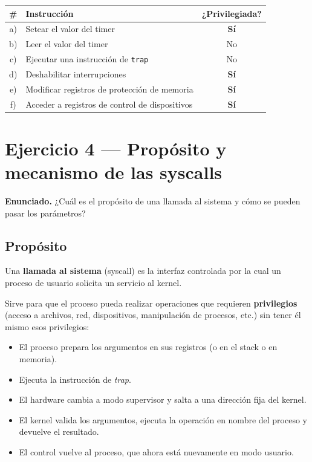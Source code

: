 \documentclass[11pt,a4paper]{article}
\begin{document}
\begin{center}
\small
\begin{tabular}{@{}clc@{}}
\toprule
\# & Instrucción                                    & ¿Privilegiada? \\
\midrule
a) & Setear el valor del timer                      & \textbf{Sí}    \\
b) & Leer el valor del timer                        & No             \\
c) & Ejecutar una instrucción de \texttt{trap}      & No             \\
d) & Deshabilitar interrupciones                    & \textbf{Sí}    \\
e) & Modificar registros de protección de memoria  & \textbf{Sí}    \\
f) & Acceder a registros de control de dispositivos & \textbf{Sí}    \\
\bottomrule
\end{tabular}
\end{center}

\section{Ejercicio 4 --- Propósito y mecanismo de las syscalls}

\textbf{Enunciado.} ¿Cuál es el propósito de una llamada al sistema
y cómo se pueden pasar los parámetros?

\subsection*{Propósito}

Una \textbf{llamada al sistema} (syscall) es la interfaz controlada
por la cual un proceso de usuario solicita un servicio al kernel.

Sirve para que el proceso pueda realizar operaciones que requieren
\textbf{privilegios} (acceso a archivos, red, dispositivos,
manipulación de procesos, etc.) sin tener él mismo esos privilegios:

\begin{itemize}[leftmargin=*,nosep]
    \item El proceso prepara los argumentos en sus registros (o en
        el stack o en memoria).
    \item Ejecuta la instrucción de \emph{trap}.
    \item El hardware cambia a modo supervisor y salta a una
        dirección fija del kernel.
    \item El kernel valida los argumentos, ejecuta la operación en
        nombre del proceso y devuelve el resultado.
    \item El control vuelve al proceso, que ahora está nuevamente
        en modo usuario.
\end{itemize}
\end{document}
